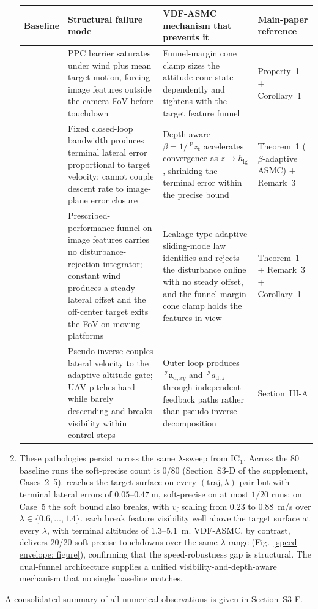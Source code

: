 \begin{enumerate}
\begin{table}[!t]
\centering
\caption{}
\label{mechanism contrast: table}
\footnotesize
\setlength{\tabcolsep}{4pt}
\begin{tabular}{p{} p{} p{} p{}}
\toprule
\textbf{Baseline} & \textbf{Structural failure mode} & \textbf{VDF-ASMC mechanism that prevents it} & \textbf{Main-paper reference} \\
\midrule
\cite{lin2022} & PPC barrier saturates under wind plus mean target motion, forcing image features outside the camera FoV before touchdown & Funnel-margin cone clamp sizes the attitude cone state-dependently and tightens with the target feature funnel & Property~1 + Corollary~1 \\
\cite{zhang2026} & Fixed closed-loop bandwidth produces terminal lateral error proportional to target velocity; cannot couple descent rate to image-plane error closure & Depth-aware $\beta=1/\,^\mathcal{V}z_\text{t}$ accelerates convergence as $z\to h_\text{lg}$, shrinking the terminal error within the precise bound & Theorem~1 ($\beta$-adaptive ASMC) + Remark~3 \\
\cite{lin2023} & Prescribed-performance funnel on image features carries no disturbance-rejection integrator; constant wind produces a steady lateral offset and the off-center target exits the FoV on moving platforms & Leakage-type adaptive sliding-mode law identifies and rejects the disturbance online with no steady offset, and the funnel-margin cone clamp holds the features in view & Theorem~1 + Remark~3 + Corollary~1 \\
\cite{cho2022} & Pseudo-inverse couples lateral velocity to the adaptive altitude gate; UAV pitches hard while barely descending and breaks visibility within control steps & Outer loop produces $\,^\mathcal{I}\boldsymbol{a}_{\text{d},xy}$ and $\,^\mathcal{I}a_{\text{d},z}$ through independent feedback paths rather than pseudo-inverse decomposition & Section~III-A \\
\bottomrule
\end{tabular}
\end{table}
    \item These pathologies persist across the same $\lambda$-sweep from IC$_1$. Across the $80$ baseline runs the soft-precise count is $0/80$ (Section~S3-D of the supplement, Cases~2--5). \cite{zhang2026} reaches the target surface on every $(\text{traj},\lambda)$ pair but with terminal lateral errors of $0.05$--$0.47~\text{m}$, soft-precise on at most $1/20$ runs; on Case~5 the soft bound also breaks, with $v_\text{f}$ scaling from $0.23$ to $0.88$~m/s over $\lambda\in\{0.6,\ldots,1.4\}$. \cite{lin2022,lin2023,cho2022} each break feature visibility well above the target surface at every $\lambda$, with terminal altitudes of $1.3$--$5.1$~m. VDF-ASMC, by contrast, delivers $20/20$ soft-precise touchdowns over the same $\lambda$ range (Fig.~\ref{speed envelope: figure}), confirming that the speed-robustness gap is structural. The dual-funnel architecture supplies a unified visibility-and-depth-aware mechanism that no single baseline matches.
\end{enumerate}

A consolidated summary of all numerical observations is given in Section~S3-F.
